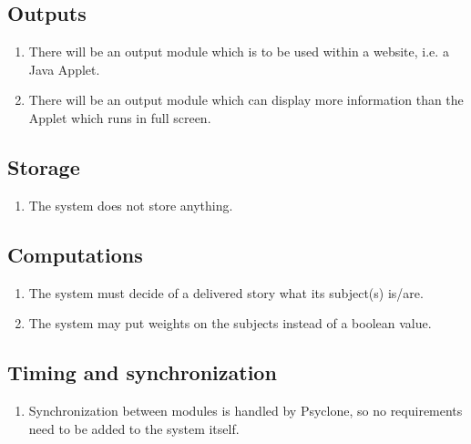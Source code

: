 \subsection{Outputs}

\begin{enumerate}
  \item There will be an output module which is to be used within a website, i.e. a Java Applet.
  \item There will be an output module which can display more information than
        the Applet which runs in full screen.
\end{enumerate}

\subsection{Storage}

\begin{enumerate}
  \item The system does not store anything.
\end{enumerate}

\subsection{Computations}

\begin{enumerate}
  \item The system must decide of a delivered story what its subject(s) is/are.
  \item The system may put weights on the subjects instead of a boolean value.
\end{enumerate}

\subsection{Timing and synchronization}

\begin{enumerate}
  \item Synchronization between modules is handled by Psyclone, so no
        requirements need to be added to the system itself.
\end{enumerate}

